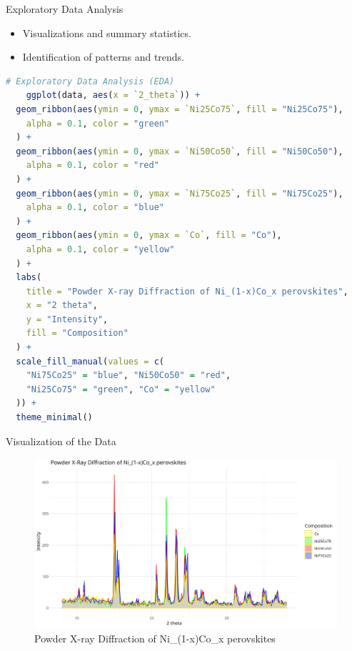\documentclass[aspectratio=169]{beamer}
\begin{document}
\begin{frame}[fragile]{Exploratory Data Analysis}
    \begin{itemize}
        \item Visualizations and summary statistics.
        \item Identification of patterns and trends.
    \end{itemize}

    \begin{lstlisting}[language=R, basicstyle=\tiny\ttfamily]
    # Exploratory Data Analysis (EDA)
    ggplot(data, aes(x = `2_theta`)) +
  geom_ribbon(aes(ymin = 0, ymax = `Ni25Co75`, fill = "Ni25Co75"),
    alpha = 0.1, color = "green"
  ) +
  geom_ribbon(aes(ymin = 0, ymax = `Ni50Co50`, fill = "Ni50Co50"),
    alpha = 0.1, color = "red"
  ) +
  geom_ribbon(aes(ymin = 0, ymax = `Ni75Co25`, fill = "Ni75Co25"),
    alpha = 0.1, color = "blue"
  ) +
  geom_ribbon(aes(ymin = 0, ymax = `Co`, fill = "Co"),
    alpha = 0.1, color = "yellow"
  ) +
  labs(
    title = "Powder X-ray Diffraction of Ni_(1-x)Co_x perovskites",
    x = "2 theta",
    y = "Intensity",
    fill = "Composition"
  ) +
  scale_fill_manual(values = c(
    "Ni75Co25" = "blue", "Ni50Co50" = "red",
    "Ni25Co75" = "green", "Co" = "yellow"
  )) +
  theme_minimal()
    \end{lstlisting}
\end{frame}

\begin{frame}{Visualization of the Data}
    \begin{figure}
        \centering
        \includegraphics[width=1\textwidth]{../plot/graph_nb.png}
        \caption{Powder X-ray Diffraction of Ni\_(1-x)Co\_x perovskites}
        \label{fig:xrd}
    \end{figure}
\end{frame}
\end{document}
